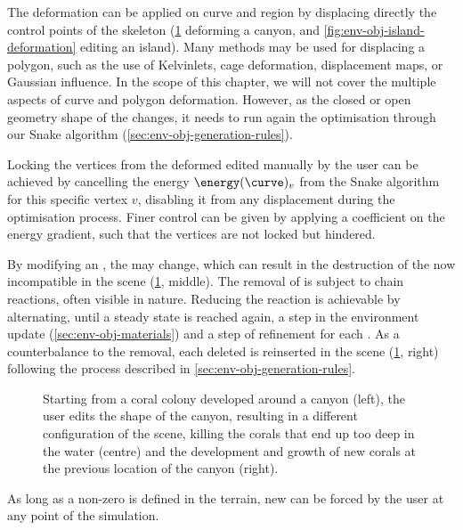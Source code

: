 The deformation  can be applied on curve and region  by displacing directly the control points of the skeleton (\cref{fig:env-obj-user-interaction} deforming a canyon, and \cref{fig:env-obj-island-deformation} editing an island). Many methods may be used for displacing a polygon, such as the use of Kelvinlets, cage deformation, displacement maps, or Gaussian influence. In the scope of this chapter, we will not cover the multiple aspects of curve and polygon deformation. However, as the closed or open geometry shape of the  changes, it needs to run again the  optimisation through our Snake algorithm (\cref{sec:env-obj-generation-rules}).

Locking the vertices from the deformed  edited manually by the user can be achieved by cancelling the energy $\energy(\curve)_v$ from the Snake algorithm for this specific vertex $v$, disabling it from any displacement during the optimisation process. Finer control can be given by applying a coefficient on the energy gradient, such that the vertices are not locked but hindered.

By modifying an , the  may change, which can result in the destruction of the now incompatible  in the scene (\cref{fig:env-obj-user-interaction}, middle). The removal of  is subject to chain reactions, often visible in nature. Reducing the reaction is achievable by alternating, until a steady state is reached again, a step in the environment update (\cref{sec:env-obj-materials}) and a step of  refinement for each . As a counterbalance to the removal, each deleted  is reinserted in the scene (\cref{fig:env-obj-user-interaction}, right) following the process described in \cref{sec:env-obj-generation-rules}.

\begin{figure}
\caption{Starting from a coral colony developed around a canyon (left), the user edits the shape of the canyon, resulting in a different configuration of the scene, killing the corals that end up too deep in the water (centre) and the development and growth of new corals at the previous location of the canyon (right).}
\label{fig:env-obj-user-interaction}
\end{figure}

As long as a non-zero  is defined in the terrain, new  can be forced by the user at any point of the simulation.

